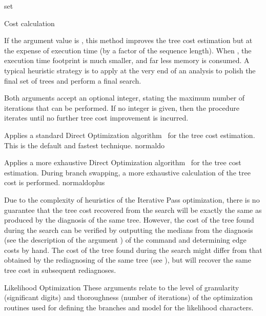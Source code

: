 \begin{command}{set}{}
\begin{arguments}
\begin{argumentgroup}{Cost calculation}
{\setlength{\parindent}{0.5cm}                
\indent
If the argument value is , this method improves the tree
cost estimation but at the expense of execution time (by a factor of the sequence length).
When , the execution time footprint is much
smaller, and far less memory is consumed.
A typical heuristic strategy is to apply  at the 
very end of an analysis to polish the final set of trees and perform a final search. 

\setlength{\parindent}{0.5cm}                
\indent
Both arguments accept an optional integer, stating the maximum
number of iterations that can be performed. If no integer is
given, then the procedure iterates until no further tree cost
improvement is incurred.}
{}

{Applies a standard Direct Optimization algorithm~\cite{Varon2013} for the tree
cost estimation. This is the default and fastest technique.}
{normaldo}

{Applies a more exhaustive Direct Optimization algorithm~\cite{Varon2013} 
for the tree cost estimation. During branch swapping, a more exhaustive 
calculation of the tree cost is performed.}
{normaldoplus}


\begin{statement}
Due to the complexity of heuristics of the Iterative Pass
optimization, there is no guarantee that the tree cost recovered
from the search will be exactly the same as produced by the
diagnosis of the same tree. However, the cost of the tree found
during the search can be verified by outputting the medians from
the diagnosis (see the description of the argument
) of the command
 and determining edge costs by hand. The cost
of the tree found during the search might differ from that
obtained by the rediagnosing of the same tree (see
), but will recover the same
tree cost in subsequent rediagnoses. 
\end{statement}

\end{argumentgroup}

\begin{argumentgroup}{Likelihood Optimization}
{These arguments relate to the level of granularity (significant digits) and 
thoroughness (number of iterations) of the
optimization routines used for defining the branches and model for
the likelihood characters.}


\end{argumentgroup}
\end{arguments}
\end{command}
